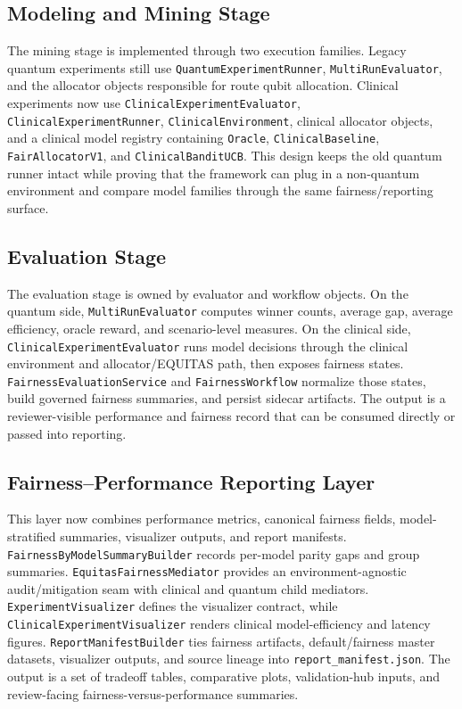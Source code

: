 \documentclass{IEEEtran}
\begin{document}
\subsection{Modeling and Mining Stage}
The mining stage is implemented through two execution families. Legacy quantum experiments still use \texttt{QuantumExperimentRunner}, \texttt{MultiRunEvaluator}, and the allocator objects responsible for route qubit allocation. Clinical experiments now use \texttt{ClinicalExperimentEvaluator}, \texttt{ClinicalExperimentRunner}, \texttt{ClinicalEnvironment}, clinical allocator objects, and a clinical model registry containing \texttt{Oracle}, \texttt{ClinicalBaseline}, \texttt{FairAllocatorV1}, and \texttt{ClinicalBanditUCB}. This design keeps the old quantum runner intact while proving that the framework can plug in a non-quantum environment and compare model families through the same fairness/reporting surface.

\subsection{Evaluation Stage}
The evaluation stage is owned by evaluator and workflow objects. On the quantum side, \texttt{MultiRunEvaluator} computes winner counts, average gap, average efficiency, oracle reward, and scenario-level measures. On the clinical side, \texttt{ClinicalExperimentEvaluator} runs model decisions through the clinical environment and allocator/EQUITAS path, then exposes fairness states. \texttt{FairnessEvaluationService} and \texttt{FairnessWorkflow} normalize those states, build governed fairness summaries, and persist sidecar artifacts. The output is a reviewer-visible performance and fairness record that can be consumed directly or passed into reporting.

\subsection{Fairness--Performance Reporting Layer}
This layer now combines performance metrics, canonical fairness fields, model-stratified summaries, visualizer outputs, and report manifests. \texttt{FairnessByModelSummaryBuilder} records per-model parity gaps and group summaries. \texttt{EquitasFairnessMediator} provides an environment-agnostic audit/mitigation seam with clinical and quantum child mediators. \texttt{ExperimentVisualizer} defines the visualizer contract, while \texttt{ClinicalExperimentVisualizer} renders clinical model-efficiency and latency figures. \texttt{ReportManifestBuilder} ties fairness artifacts, default/fairness master datasets, visualizer outputs, and source lineage into \texttt{report\_manifest.json}. The output is a set of tradeoff tables, comparative plots, validation-hub inputs, and review-facing fairness-versus-performance summaries.
\end{document}
